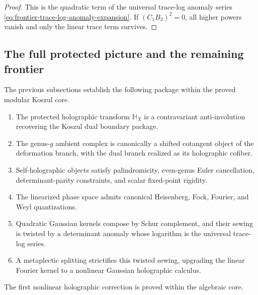 \begin{proof}
This is the quadratic term of the universal trace-log anomaly series
\eqref{eq:frontier-trace-log-anomaly-expansion}. If $(C_1B_2)^2=0$, all higher
powers vanish and only the linear trace term survives.
\end{proof}

\subsection{The full protected picture and the remaining frontier}
\label{subsec:frontier-full-protected-picture}

\begin{remark}
\label{rem:frontier-what-is-now-proved}
The previous subsections establish the following package within the
proved modular Koszul core.
\begin{enumerate}[label=\textup{(\roman*)}]
\item The protected holographic transform $\mathbb H_X$ is a contravariant
 anti-involution recovering the Koszul dual boundary package.
\item The genus-$g$ ambient complex is canonically a shifted cotangent object of
 the deformation branch, with the dual branch realized as its holographic
 cofiber.
\item Self-holographic objects satisfy palindromicity, even-genus Euler
 cancellation, determinant-parity constraints, and scalar fixed-point
 rigidity.
\item The linearized phase space admits canonical Heisenberg, Fock, Fourier, and
 Weyl quantizations.
\item Quadratic Gaussian kernels compose by Schur complement, and their sewing is
 twisted by a determinant anomaly whose logarithm is the universal trace-log
 series.
\item A metaplectic splitting strictifies this twisted sewing, upgrading
 the linear Fourier kernel to a nonlinear Gaussian holographic
 calculus.
\end{enumerate}
The first nonlinear holographic correction is proved within the algebraic core.
\end{remark}

